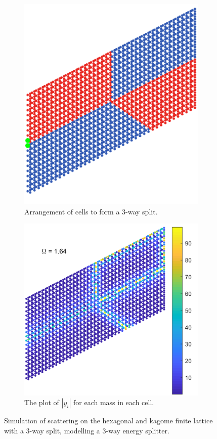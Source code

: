 \begin{figure}[!h]
\medskip
\centering
\begin{subfigure}[b]{.5\textwidth}
  \centering
  \includegraphics[width=0.8\linewidth]{imgs/kagomeesplitarr.png}
  \caption{Arrangement of cells to form a 3-way split.}
  \label{fig:sub1}
\end{subfigure}%
\begin{subfigure}[b]{.5\textwidth}
  \centering
  \includegraphics[width=1\linewidth]{imgs/kagomeesplitscat.png}
  \caption{The plot of $|y_i|$ for each mass in each cell.}
  \label{fig:kagomeesplit}
\end{subfigure}
\caption{Simulation of scattering on the hexagonal and kagome finite lattice
  with a 3-way split, modelling a 3-way energy splitter.}
\label{fig:esplit}
\end{figure}

